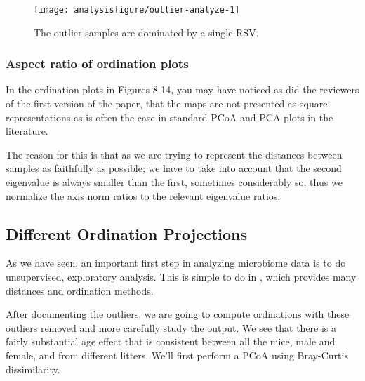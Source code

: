 \begin{knitrout}
\color{fgcolor}\begin{kframe}
\begin{alltt}
 \hlkwb{<-} \hlstd{(}\hlstd{(} \hlstd{,} \hlstd{(} \hlopt{/} 
\hlstd{(rel_abund[,} \hlstd{],}  \hlstd{=} \hlstd{)} \hlopt{+}
  \hlstd{(}\hlstd{)}
\end{alltt}
\end{kframe}
\end{knitrout}
\begin{figure}[H]
\texttt{[image: analysisfigure/outlier-analyze-1]}
\caption{The outlier samples are dominated by a single RSV.}
\label{fig:outlier-analysize}
\end{figure}

\subsubsection*{Aspect ratio of ordination plots}
In the ordination plots in Figures 8-14, you may have noticed as did the reviewers of the first version of the paper, that
the maps are not presented as square representations as is often the case in
standard PCoA and PCA plots in the literature.

The reason for this is that as we are trying to represent the distances between samples as faithfully as possible;
we have to take into account that the second eigenvalue is always smaller
than the first, sometimes considerably so, thus we normalize the axis norm ratios to the relevant eigenvalue ratios.

\subsection*{Different Ordination Projections}

As we have seen, an important first step in analyzing microbiome data is to do
unsupervised, exploratory analysis. This is simple to do in
, which provides many distances and ordination
methods.

After documenting the outliers, we are going to compute ordinations
with these outliers removed and more carefully study the output. We
see that there is a fairly substantial age effect that is consistent
between all the mice, male and female, and from different
litters. We'll first perform a PCoA using Bray-Curtis dissimilarity.

